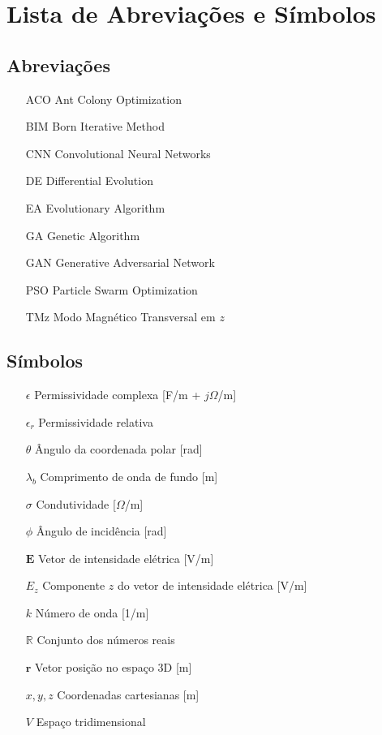 \newpage
\chapter*{Lista de Abreviações e Símbolos} %

	\section*{Abreviações}
	
		\begin{itemize}[labelwidth=5em,leftmargin=\dimexpr{}+\relax,align=left]
			\item[ACO] Ant Colony Optimization
			\item[BIM] Born Iterative Method
			\item[CNN] Convolutional Neural Networks
			\item[DE] Differential Evolution
			\item[EA] Evolutionary Algorithm
			\item[GA] Genetic Algorithm
			\item[GAN] Generative Adversarial Network
			\item[PSO] Particle Swarm Optimization
			\item[TMz] Modo Magnético Transversal em $z$
		\end{itemize}
	
		\thispagestyle{empty}

	\section*{Símbolos}
	
		\thispagestyle{empty}
	
		\begin{itemize}[labelwidth=4em,leftmargin=\dimexpr{}+\relax,align=left]
			\item[$\epsilon$] Permissividade complexa [F/m + $j\Omega$/m]
			\item[$\epsilon_r$] Permissividade relativa
			\item[$\theta$] Ângulo da coordenada polar [rad]
			\item[$\lambda_b $] Comprimento de onda de fundo [m]
			\item[$\sigma$] Condutividade [$\Omega$/m]
			\item[$\phi$] Ângulo de incidência [rad]
			\item[$\mathbf{E}$] Vetor de intensidade elétrica [V/m]
			\item[$E_z$] Componente $z$ do vetor de intensidade elétrica [V/m]
			\item[$k$] Número de onda [1/m]
			\item[$\mathbb{R}$] Conjunto dos números reais
			\item[$\mathbf{r}$] Vetor posição no espaço 3D [m]
			\item[$x, y, z$] Coordenadas cartesianas [m]
			\item[$V$] Espaço tridimensional
		\end{itemize}
	
		\thispagestyle{empty}
	
	